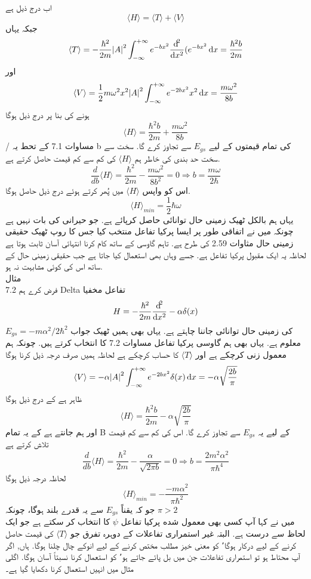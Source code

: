 اب درج ذیل ہے
 \[ \langle H \rangle=\langle T \rangle + \langle V \rangle\]
جبکہ یہاں
\[\langle T \rangle=-\frac{\hbar^{2}}{2m}\abs{A}^{2}\int_{-\infty}^{+\infty}e^{-bx^{2}}\frac{\dif^{2}}{\dif{x^{2}}}(e^{-bx^{2}}\dif{x}=\frac{\hbar^{2}b}{2m}\]
اور
\[\langle V\rangle=\frac{1}{2}m\omega^{2}x^{2}\abs{A}^{2}\int_{-\infty}^{+\infty}e^{-2bx^{2}}x^{2}\dif{x}=\frac{m\omega^{2}}{8b}\]
ہونے کی بنا پر درج ذیل ہوگا
\[ \langle H \rangle=\frac{\hbar^{2}b}{2m}+\frac{m\omega^{2}}{8b}\]
/
مساوات 7.1 کے تحط یہ b کی تمام قیمتوں کے لیے
\(E_{gs}\)
 سے تجاوز کرے گا. سخت سے سخت حد بندی کی خاطر ہم
 \( \langle H\rangle\)
 کی کم سے کم قیمت حاصل کرتے ہے.
\[\frac{d}{db}\langle H\rangle=\frac{\hbar^{2}}{2m}-\frac{m\omega^{2}}{8b^{2}}=0\Rightarrow b=\frac{m\omega}{2\hbar}\]
اس کو واپس
 \( \langle H\rangle \)
میں پُھر کرتے ہوئے درج ذیل حاصل ہوگا.
 \[\langle H\rangle _{min} =\frac{1}{2}\hbar\omega\]
یہاں ہم بالکل ٹھیک زمینی حال توانائی حاصل کرپائے ہے. جو حیرانی کی بات نہیں ہے چونکہ میں نے اتفاقی طور پر ایسا پرکیا تفاعل منتخب کیا جس کا روپ ٹھیک حقیقی زمینی حال مثاوات 2.59 کی طرح ہے.  تاہم گاوسی کے ساتھ کام کرنا انتہائی آسان ثابت ہوتا ہے لحاظہ یہ ایک مقبول پرکیا تفاعل ہے. جسے وہاں بھی استعمال کیا جاتا ہے جب حقیقی زمینی حال کے ساتھ اس کی کوئی مشابہت نہ ہو.\\
مثال \\7.2
فرض کرے ہم Delta تفاعل مخفیا
\[H=-\frac{\hbar^{2}}{2m}\frac{\dif^{2}}{\dif{x^{2}}}-\alpha\delta(x)\]
کی زمینی حال توانائی جاننا چاہتے ہے. یہاں بھی ہمیں ٹھیک جواب
\(E_{gs}=-m\alpha^{2}/2\hbar^{2}\)
معلوم ہے. یہاں بھی ہم گاوسی پرکیا تفاعل مساوات 7.2 کا انتخاب کرتے ہیں. چونکہ ہم معمول زنی کرچکے ہے اور 
\(\langle T\rangle\)
 کا حساب کرچکے ہے لحاظہ ہمیں صرف درجہ ذیل کرنا ہوگا
\[\langle V\rangle=-\alpha\abs{A}^{2}\int_{-\infty}^{+\infty}e^{-2bx^{2}}\delta(x)\dif{x}=-\alpha\sqrt{\frac{2b}{\pi}}\]
ظاہر ہے کے درج ذيل ہوگا
 \[\langle H\rangle=\frac{\hbar^{2}b}{2m}-\alpha\sqrt{\frac{2b}{\pi}}\]
اور ہم جانتے ہے کے یہ تمام B کے لیے یہ
\( E_{gs}\)
 سے تجاوز کرے گا. اس کی کم سے كم قیمت تلاش کرتے ہے\\
\[\frac{d}{db}\langle H\rangle=\frac{\hbar^{2}}{2m}-\frac{\alpha}{\sqrt{2\pi b}}=0\Rightarrow b=\frac{2m^{2}\alpha^{2}}{\pi\hbar^{4}}\]
لحاظہ درجہ ذیل ہوگا 
 \[\langle H\rangle _{min} =-\frac{-m\alpha^{2}}{\pi\hbar^{2}}\]
جو کہ یقناً
\( E_{gs}\)
 سے یہ قدرے بلند ہوگا، چونکہ
\(\pi>2\) \\
میں نے کہا آپ کسی بھی معمول شده پرکیا تفاعل 
\(\psi\) 
کا انتخاب کر سکتے ہے جو ایک لحاظ سے درست ہے. البتہ غیر استمراری تفاعلات کے دوہرہ تفرق جو
\( \langle T \rangle\)
کی قیمت حاصل کرنے کے لیے درکار ہوگا٬ کو معنی خیز مطلب مختص کرنے کے لیے انوکے چال چلنا ہوگا. ہاں, اگر آپ محتاط ہو تو استمراری تفاعلات جن میں بل پائے جاتے ہو٬ کو استعمال کرنا نسبتاً آسان ہوگا. اگلی مثال میں انہیں استعمال کرنا دکھایا گیا ہے۔


